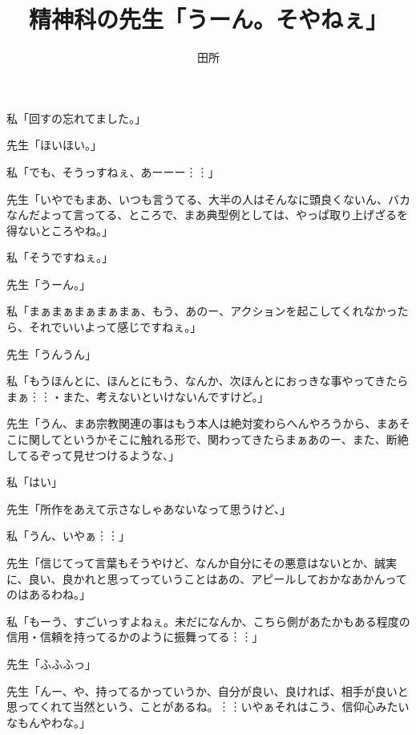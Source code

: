 \documentclass[b5j,twoside,twocolumn]{utarticle}
\title{精神科の先生「うーん。そやねぇ」}
\author{田所}
\date{\vspace{-5mm}}
\makeatletter
\def\yakuchu{%
\@ifnextchar[\@xfootnote %
{\stepcounter{yakuchu}%
\protected@xdef\@thefnmark{\theyakuchu}%
\@footnotemark\@footnotetext}}
\makeatother
\begin{document}
\maketitle

\setlength{\footskip}{-2mm}
\chead[]{}
\lfoot[]{\thepage{}}
\cfoot[]{}
\rfoot[\thepage{}]{}

\let\yakuchu=\endnote
\renewcommand{\footnoterule}{\noindent\rule{100mm}{0.3mm}\vskip2mm}
\thispagestyle{fancy}
\begin{description}
\setlength{\leftskip}{-3.0zw}
\setlength{\itemsep}{-0.3zw} %
\item 私「回すの忘れてました。」
\item 先生「ほいほい。」
\item 私「でも、そうっすねぇ、あーーー︙︙」
\item 先生「いやでもまあ、いつも言うてる、大半の人はそんなに頭良くないん、バカなんだよって言ってる、ところで、まあ典型例としては、やっぱ取り上げざるを得ないところやね。」
\item 私「そうですねぇ。」
\item 先生「うーん。」
\item 私「まぁまぁまぁまぁまぁ、もう、あのー、アクションを起こしてくれなかったら、それでいいよって感じですねぇ。」
\item 先生「うんうん」
\item 私「もうほんとに、ほんとにもう、なんか、次ほんとにおっきな事やってきたらまぁ︙︙・また、考えないといけないんですけど。」
\item 先生「うん、まあ宗教関連の事はもう本人は絶対変わらへんやろうから、まあそこに関してというかそこに触れる形で、関わってきたらまぁあのー、また、断絶してるぞって見せつけるような、」
\item 私「はい」
\item 先生「所作をあえて示さなしゃあないなって思うけど、」
\item 私「うん、いやぁ︙︙」
\item 先生「信じてって言葉もそうやけど、なんか自分にその悪意はないとか、誠実に、良い、良かれと思ってっていうことはあの、アピールしておかなあかんってのはあるわね。」
\item 私「もーう、すごいっすよねぇ。未だになんか、こちら側があたかもある程度の信用・信頼を持ってるかのように振舞ってる︙︙」
\item 先生「ふふふっ」
\item 先生「んー、や、持ってるかっていうか、自分が良い、良ければ、相手が良いと思ってくれて当然という、ことがあるね。︙︙いやぁそれはこう、信仰心みたいなもんやわな。」

\end{description}
\end{document}
